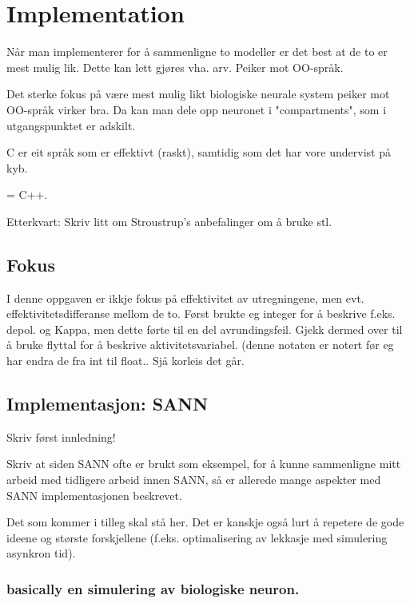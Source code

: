 
\chapter{ Implementation }


	Når man implementerer for å sammenligne to modeller er det best at de to er mest mulig lik. Dette kan lett gjøres vha. arv. Peiker mot OO-språk.
	
	Det sterke fokus på være mest mulig likt biologiske neurale system peiker mot OO-språk virker bra. Da kan man dele opp neuronet i "compartments", som i utgangspunktet er adskilt.

	C er eit språk som er effektivt (raskt), samtidig som det har vore undervist på kyb.

	= C++.

	Etterkvart: Skriv litt om Stroustrup's anbefalinger om å bruke stl.




\section{Fokus}
I denne oppgaven er ikkje fokus på effektivitet av utregningene, men evt. effektivitetsdifferanse mellom de to. 
Først brukte eg integer for å beskrive f.eks. depol. og Kappa, men dette førte til en del avrundingsfeil. 
Gjekk dermed over til å bruke flyttal for å beskrive aktivitetsvariabel. (denne notaten er notert før eg har endra de fra int til float.. Sjå korleis det går.


\section{Implementasjon: SANN}
	Skriv først innledning!

	Skriv at siden SANN ofte er brukt som eksempel, for å kunne sammenligne mitt arbeid med tidligere arbeid innen SANN, så er allerede mange aspekter med SANN implementasjonen beskrevet.

	Det som kommer i tilleg skal stå her.
	Det er kanskje også lurt å repetere de gode ideene og største forskjellene (f.eks. optimalisering av lekkasje med simulering asynkron tid).
	\subsection{basically en simulering av biologiske neuron.}
